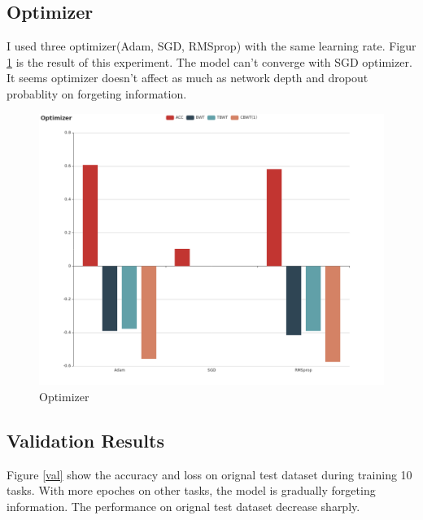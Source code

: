 \documentclass{article}
\begin{document}
\subsection{Optimizer}
I used three optimizer(Adam, SGD, RMSprop) with the same learning rate. Figur \ref{optimizer} is the result of this experiment. The model can't converge with SGD optimizer. It seems optimizer doesn't affect as much as network depth and dropout probablity on forgeting information.

\begin{figure}[htbp]
\centering
\includegraphics[scale=0.3]{img/Optimizer.png}
\caption{Optimizer}
\label{optimizer}
\end{figure}

\subsection{Validation Results}
Figure \ref{val} show the accuracy and loss on orignal test dataset during training 10 tasks. With more epoches on other tasks, the model is gradually forgeting information. The performance on orignal test dataset decrease sharply.
\end{document}

